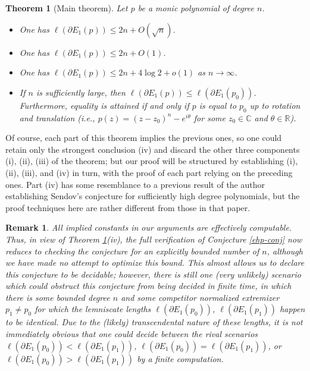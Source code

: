 \documentclass[12pt]{amsart}
\newtheorem{theorem}{Theorem}[section]
\newtheorem{remark}{Remark}[section]
\newcommand{\R}{\mathbb{R}}
\newcommand{\C}{\mathbb{C}}
\begin{document}
\begin{theorem}[Main theorem]\label{main-thm}  Let $p$ be a monic polynomial of degree $n$.
\begin{itemize}
    \item[(i)] One has $\ell(\partial E_1(p)) \leq 2n + O(\sqrt{n})$.
    \item[(ii)] One has $\ell(\partial E_1(p)) \leq 2n + O(1)$.
    \item[(iii)] One has $\ell(\partial E_1(p)) \leq 2n + 4 \log 2 + o(1)$ as $n \to \infty$.
    \item[(iv)] If $n$ is sufficiently large, then $\ell(\partial E_1(p)) \leq \ell(\partial E_1(p_0))$.  Furthermore, equality is attained if and only if $p$ is equal to $p_0$ up to rotation and translation (i.e., $p(z) = (z-z_0)^n - e^{i\theta}$ for some $z_0 \in \C$ and $\theta \in \R$).
\end{itemize}
\end{theorem}

Of course, each part of this theorem implies the previous ones, so one could retain only the strongest conclusion (iv) and discard the other three components (i), (ii), (iii) of the theorem; but our proof will be structured by establishing (i), (ii), (iii), and (iv) in turn, with the proof of each part relying on the preceding ones.  Part (iv) has some resemblance to a previous result \cite{tao-sendov} of the author establishing Sendov's conjecture for sufficiently high degree polynomials, but the proof techniques here are rather different from those in that paper.

\begin{remark}  All implied constants in our arguments are effectively computable.  Thus, in view of Theorem \ref{main-thm}(iv), the full verification of Conjecture \ref{ehp-conj} now reduces to checking the conjecture for an explicitly bounded number of $n$, although we have made no attempt to optimize this bound.  This \emph{almost} allows us to declare this conjecture to be decidable; however, there is still one (very unlikely) scenario which could obstruct this conjecture from being decided in finite time, in which there is some bounded degree $n$ and some competitor normalized extremizer $p_1 \neq p_0$ for which the lemniscate lengths $\ell(\partial E_1(p_0))$, $\ell(\partial E_1(p_1))$ happen to be identical.  Due to the (likely) transcendental nature of these lengths, it is not immediately obvious that one could decide between the rival scenarios $\ell(\partial E_1(p_0)) < \ell(\partial E_1(p_1))$, $\ell(\partial E_1(p_0)) = \ell(\partial E_1(p_1))$, or $\ell(\partial E_1(p_0)) > \ell(\partial E_1(p_1))$ by a finite computation.
\end{remark}
\end{document}
